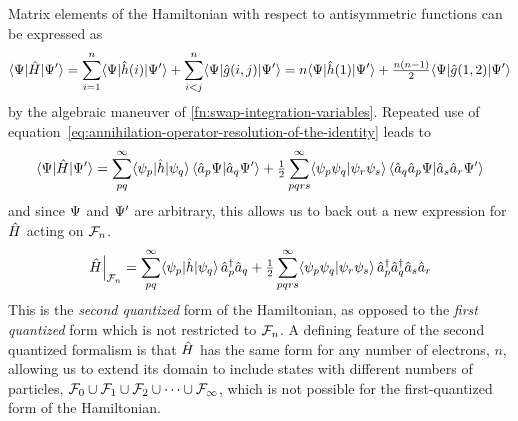 \documentclass[11pt]{article}
\numberwithin{equation}{section}
\begin{document}
Matrix elements of the Hamiltonian with respect to antisymmetric functions can be expressed as
\begin{align}
  \langle\Psi |\hat{H}|\Psi '\rangle
=
  \sum_{i=1}^n\langle\Psi |\hat{h}(i)|\Psi '\rangle
+
  \sum_{i<j}^n\langle\Psi |\hat{g}(i,j)|\Psi '\rangle
=
  n\langle\Psi |\hat{h}(1)|\Psi '\rangle
+
  \tfrac{n(n-1)}{2}
  \langle\Psi |\hat{g}(1,2)|\Psi '\rangle
\end{align}
by the algebraic maneuver of \cref{fn:swap-integration-variables}.
Repeated use of equation~\ref{eq:annihilation-operator-resolution-of-the-identity} leads to
\begin{align*}
  \langle\Psi |\hat{H}|\Psi '\rangle
=
  \sum_{pq}^\infty
  \langle\psi _p|\hat{h}|\psi _q\rangle\,\langle\hat{a}_p\Psi |\hat{a}_q\Psi '\rangle
+
  \tfrac{1}{2}
  \sum_{pqrs}^\infty
  \langle\psi _p\psi _q|\psi _r\psi _s\rangle\,\langle\hat{a}_q\hat{a}_p\Psi |\hat{a}_s\hat{a}_r\Psi '\rangle
\end{align*}
and since $\Psi $ and $\Psi '$ are arbitrary, this allows us to back out a new expression for $\hat{H}$ acting on $\mathcal{F}_n$.
\begin{align}\label{eq:second-quantized-hamiltonian}
  \left.
  \hat{H}
  \right|_{\mathcal{F}_n}
=
  \sum_{pq}^\infty
  \langle\psi _p|\hat{h}|\psi _q\rangle\,
  \hat{a}_p^\dagger \hat{a}_q
+
  \tfrac{1}{2}
  \sum_{pqrs}^\infty
  \langle\psi _p\psi _q|\psi _r\psi _s\rangle\,
  \hat{a}_p^\dagger\hat{a}_q^\dagger\hat{a}_s\hat{a}_r
\end{align}
This is the \textit{second quantized} form of the Hamiltonian, as opposed to the \textit{first quantized} form which is not restricted to $\mathcal{F}_n$.
A defining feature of the second quantized formalism is that $\hat{H}$ has the same form for any number of electrons, $n$, allowing us to extend its domain to include states with different numbers of particles,
$
  \mathcal{F}_0
\cup
  \mathcal{F}_1
\cup
  \mathcal{F}_2
\cup
  \cdots
\cup
  \mathcal{F}_\infty
$,
which is not possible for the first-quantized form of the Hamiltonian.
\end{document}
